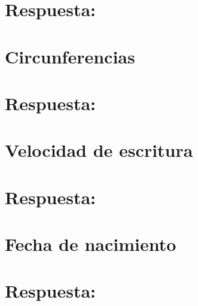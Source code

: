 \section*{Respuesta:}

\fi

\section{Circunferencias}

\ifshowanswers
\section*{Respuesta:}

\fi

\section{Velocidad de escritura}

\ifshowanswers
\section*{Respuesta:}

\fi

\section{Fecha de nacimiento}

\ifshowanswers
\section*{Respuesta:}

\fi